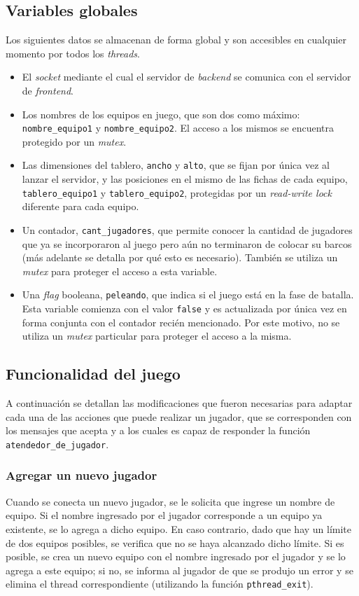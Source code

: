 \documentclass[a4paper]{article}
\begin{document}
\subsection{Variables globales}
Los siguientes datos se almacenan de forma global y son accesibles en
cualquier momento por todos los \emph{threads}.
\begin{itemize}
    \item El \emph{socket} mediante el cual el servidor de \emph{backend} se
    comunica con el servidor de \emph{frontend}.
    \item Los nombres de los equipos en juego, que son dos como máximo:
    \texttt{nombre\_equipo1} y \texttt{nombre\_equipo2}. El acceso a los
    mismos se encuentra protegido por un \emph{mutex}.
    \item Las dimensiones del tablero, \texttt{ancho} y \texttt{alto}, que se
    fijan por única vez al lanzar el servidor, y las posiciones en el mismo de
    las fichas de cada equipo, \texttt{tablero\_equipo1} y
    \texttt{tablero\_equipo2}, protegidas por un \emph{read-write lock}
    diferente para cada equipo.
    \item Un contador, \texttt{cant\_jugadores}, que permite conocer la
    cantidad de jugadores que ya se incorporaron al juego pero aún no
    terminaron de colocar su barcos (más adelante se detalla por qué esto es
    necesario). También se utiliza un \emph{mutex} para proteger el acceso a
    esta variable.
    \item Una \emph{flag} booleana, \texttt{peleando}, que indica si el juego
    está en la fase de batalla. Esta variable comienza con el valor
    \texttt{false} y es actualizada por única vez en forma conjunta con el
    contador recién mencionado. Por este motivo, no se utiliza un \emph{mutex}
    particular para proteger el acceso a la misma.
\end{itemize}

\subsection{Funcionalidad del juego}

A continuación se detallan las modificaciones que fueron necesarias para
adaptar cada una de las acciones que puede realizar un jugador, que se
corresponden con los mensajes que acepta y a los cuales es capaz de responder
la función \texttt{atendedor\_de\_jugador}.

\subsubsection{Agregar un nuevo jugador}
Cuando se conecta un nuevo jugador, se le solicita que ingrese un nombre de
equipo. Si el nombre ingresado por el jugador corresponde
a un equipo ya existente, se lo agrega a dicho equipo. En caso contrario, dado
que hay un límite de dos equipos posibles, se verifica que no se haya
alcanzado dicho límite. Si es posible, se crea un nuevo equipo con el nombre
ingresado por el jugador y se lo agrega a este equipo; si no, se informa al
jugador de que se produjo un error y se elimina el thread correspondiente
(utilizando la función \texttt{pthread\_exit}).
\end{document}
